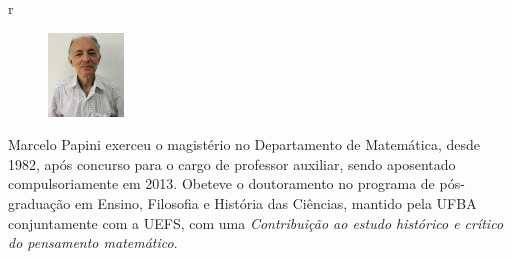 r\documentclass{hipatia}
\begin{document}


\vspace{1cm}
\begin{figure}
	\vspace{-10pt}
	\centering
	\includegraphics[width=2cm]{papini.jpg}
\end{figure}\noindent
Marcelo Papini 
exerceu o magistério no Departamento de Matemática, desde 1982,  após concurso para o cargo de professor auxiliar, sendo aposentado compulsoriamente em 2013. Obeteve o doutoramento no programa de pós-graduação em Ensino, Filosofia e História das Ciências, mantido pela UFBA conjuntamente com a UEFS, com uma \emph{Contribuição ao estudo histórico e crítico do pensamento matemático}.
\end{document}
